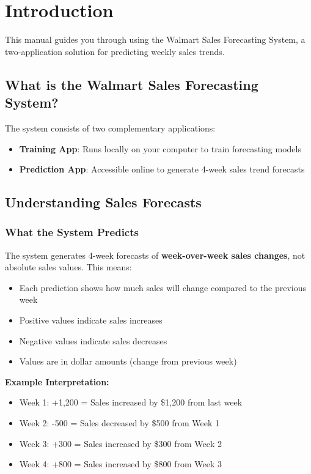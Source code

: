 \chapter{Introduction}

This manual guides you through using the Walmart Sales Forecasting System, a two-application solution for predicting weekly sales trends.

\section{What is the Walmart Sales Forecasting System?}

The system consists of two complementary applications:
\begin{itemize}
	\item \textbf{Training App}: Runs locally on your computer to train forecasting models
	\item \textbf{Prediction App}: Accessible online to generate 4-week sales trend forecasts
\end{itemize}

\section{Understanding Sales Forecasts}

\subsection{What the System Predicts}
The system generates 4-week forecasts of \textbf{week-over-week sales changes}, not absolute sales values. This means:

\begin{itemize}
	\item Each prediction shows how much sales will change compared to the previous week
	\item Positive values indicate sales increases
	\item Negative values indicate sales decreases
	\item Values are in dollar amounts (change from previous week)
\end{itemize}

\textbf{Example Interpretation:}
\begin{itemize}
	\item Week 1: +1,200 = Sales increased by \$1,200 from last week
	\item Week 2: -500 = Sales decreased by \$500 from Week 1
	\item Week 3: +300 = Sales increased by \$300 from Week 2
	\item Week 4: +800 = Sales increased by \$800 from Week 3
\end{itemize}

